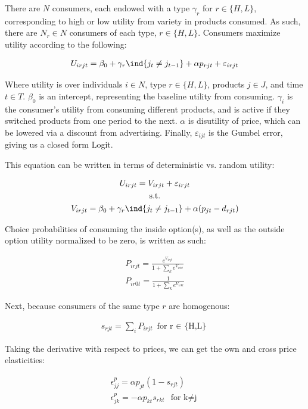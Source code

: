 \documentclass[11pt]{article}
\theoremstyle{definition}
\theoremstyle{remark}
\begin{document}
There are $N$ consumers, each endowed with a type $\gamma_r$ for $r\in\{H,L\}$, corresponding to high or low utility from variety in products consumed. As such, there are $N_r\in N$ consumers of each type, $r\in\{H,L\}$. Consumers maximize utility according to the following:

\begin{gather*}
  U_{irjt} = \beta_0 + \gamma_r\ind\{j_t\ne j_{t-1}\} + \alpha p_{rjt} +
  \varepsilon_{irjt}
\end{gather*}

Where utility is over individuals $i\in N$, type $r\in\{H,L\}$, products $j\in J$, and time $t\in T$. $\beta_0$ is an intercept, representing the baseline utility from consuming. $\gamma_i$ is the consumer's utility from consuming different products, and is active if they switched products from one period to the next. $\alpha$ is disutility of price, which can be lowered via a discount from advertising. Finally, $\varepsilon_{ijt}$ is the Gumbel error, giving us a closed form Logit.

This equation can be written in terms of deterministic vs. random utility:

\begin{gather*}
  U_{irjt} = V_{irjt} + \varepsilon_{irjt} \\
 \text{s.t.} \\
  V_{irjt} = \beta_0 + \gamma_r\ind\{j_t\ne j_{t-1}\} + \alpha(p_{jt} - d_{rjt})
\end{gather*}

Choice probabilities of consuming the inside option(s), as well as the outside option utility normalized to be zero, is written as such:

\begin{gather*}
  P_{irjt} = \frac{e^{V_{irjt}}}{1 + \sum_ke^{V_{irkt}}}\\
  P_{ir0t} = \frac{1}{1+\sum_ke^{V_{irkt}}}
\end{gather*}

Next, because consumers of the same type $r$ are homogenous:

\begin{gather*}
  s_{rjt} = \sum_iP_{irjt} \ \text{for r $\in$ \{H,L\}}
\end{gather*}

Taking the derivative with respect to prices, we can get the own and cross price
elasticities:

\begin{gather*}
  \epsilon_{jj}^p = \alpha p_{jt}(1-s_{rjt}) \\
  \epsilon_{jk}^p = -\alpha p_{kt}s_{rkt} \ \ \text{for
  k$\ne$j}
\end{gather*}
\end{document}
